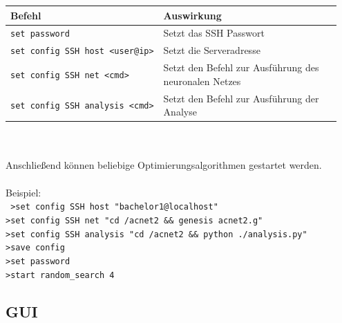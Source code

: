 \documentclass[
  a4paper,               %
  twoside,               %
  DIV=12,                %
  BCOR=8mm,              %
  headinclude=true,      %
  footinclude=false,     %
  numbers=noenddot,      %
  headheight=40pt,       %
  11pt]{scrartcl}        %
\begin{document}
\begin{tabular}{p{0.4\linewidth}|p{0.55\linewidth}}
	\toprule
	Befehl & Auswirkung\tabularnewline
	\midrule
	\texttt{set\ password} & Setzt das SSH Passwort\tabularnewline
	\texttt{set\ config\ SSH\ host\ \textless{}user@ip\textgreater{}} & Setzt
	die Serveradresse\tabularnewline
	\texttt{set\ config\ SSH\ net\ \textless{}cmd\textgreater{}} & Setzt
	den Befehl zur Ausführung des neuronalen Netzes\tabularnewline
	\texttt{set\ config\ SSH\ analysis\ \textless{}cmd\textgreater{}} &
	Setzt den Befehl zur Ausführung der Analyse\tabularnewline
	\bottomrule
\end{tabular}\\
\newline\\
Anschließend können beliebige Optimierungsalgorithmen gestartet werden.\\
\newline\\
Beispiel:\\
\texttt{
\noindent\hspace*{10mm}	>set config SSH host "bachelor1@localhost"\\
\noindent\hspace*{10mm}	>set config SSH net "cd  \raisebox{-0.6ex}{\~{ }}/acnet2 \&\& genesis acnet2.g"\\
\noindent\hspace*{10mm}	>set config SSH analysis "cd  \raisebox{-0.6ex}{\~{ }}/acnet2 \&\& python ./analysis.py"\\
\noindent\hspace*{10mm}	>save config\\
\noindent\hspace*{10mm}	>set password\\
\noindent\hspace*{10mm}	>start random\_search 4
	}\\
\subsection{GUI}
\end{document}
